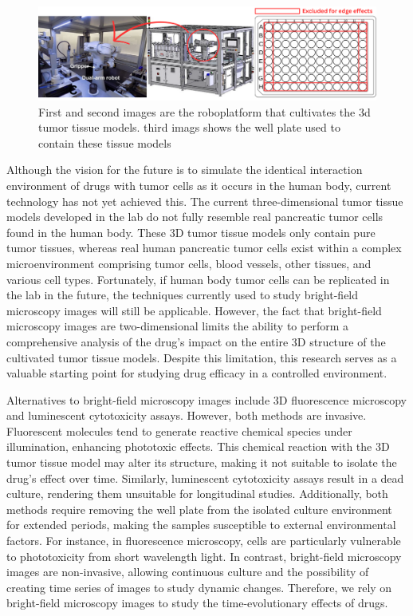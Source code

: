 \begin{figure}[H]
  \centering
  \includegraphics[width=\textwidth]{figures/labo.pdf} 
  \caption{First and second images are the roboplatform that cultivates the 3d tumor tissue models. third imags shows the well plate used to contain these tissue models}
  \label{fig:Roboplatform}
\end{figure}


Although the vision for the future is to simulate the identical interaction environment of drugs with tumor cells as it occurs in the human body, current technology has not yet achieved this. The current three-dimensional tumor tissue models developed in the lab do not fully resemble real pancreatic tumor cells found in the human body. These 3D tumor tissue models only contain pure tumor tissues, whereas real human pancreatic tumor cells exist within a complex microenvironment comprising tumor cells, blood vessels, other tissues, and various cell types.
Fortunately, if human body tumor cells can be replicated in the lab in the future, the techniques currently used to study bright-field microscopy images will still be applicable. However, the fact that bright-field microscopy images are two-dimensional limits the ability to perform a comprehensive analysis of the drug's impact on the entire 3D structure of the cultivated tumor tissue models. Despite this limitation, this research serves as a valuable starting point for studying drug efficacy in a controlled environment. 

Alternatives to bright-field microscopy images include 3D fluorescence microscopy and luminescent cytotoxicity assays. However, both methods are invasive. Fluorescent molecules tend to generate reactive chemical species under illumination, enhancing phototoxic effects. This chemical reaction with the 3D tumor tissue model may alter its structure, making it not suitable to isolate the drug's effect over time. Similarly, luminescent cytotoxicity assays result in a dead culture, rendering them unsuitable for longitudinal studies. Additionally, both methods require removing the well plate from the isolated culture environment for extended periods, making the samples susceptible to external environmental factors. For instance, in fluorescence microscopy, cells are particularly vulnerable to phototoxicity from short wavelength light. In contrast, bright-field microscopy images are non-invasive, allowing continuous culture and the possibility of creating time series of images to study dynamic changes. Therefore, we rely on bright-field microscopy images to study the time-evolutionary effects of drugs.

